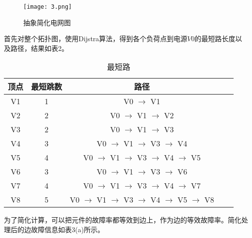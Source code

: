 \documentclass[withoutpreface,bwprint]{cumcmthesis} %
\begin{document}
\begin{figure}[H]
    \centering
    \texttt{[image: 3.png]}
    \caption{抽象简化电网图} 
\end{figure}

\indent 首先对整个拓扑图，使用Dijstra算法，得到各个负荷点到电源$V0$的最短路长度以及路径，结果如表2。
\begin{table}[!htbp]
    \caption{最短路}\centering
    \begin{tabular}{ccccc}
        \toprule[1.5pt]
        顶点 & 最短跳数 & 路径 \\  
        \midrule[1pt]
        V1 & 1 & V0 $\rightarrow$ V1  \\
        V2 & 2 & V0 $\rightarrow$ V1 $\rightarrow$ V2 \\
        V3 & 2 & V0 $\rightarrow$ V1 $\rightarrow$ V3 \\
        V4 & 3 & V0 $\rightarrow$ V1 $\rightarrow$ V3 $\rightarrow$ V4 \\
        V5 & 4 & V0 $\rightarrow$ V1 $\rightarrow$ V3 $\rightarrow$ V4 $\rightarrow$ V5\\
        V6 & 3 & V0 $\rightarrow$ V1 $\rightarrow$ V3 $\rightarrow$ V6\\
        V7 & 4 & V0 $\rightarrow$ V1 $\rightarrow$ V3 $\rightarrow$ V4 $\rightarrow$ V7\\
        V8 & 5 & V0 $\rightarrow$ V1 $\rightarrow$ V3 $\rightarrow$ V4 $\rightarrow$ V5 $\rightarrow$ V8\\
        \bottomrule[1.5pt]
    \end{tabular}
\end{table}
为了简化计算，可以把元件的故障率都等效到边上，作为边的等效故障率。简化处理后的边故障信息如表3(a)所示。
\end{document}
